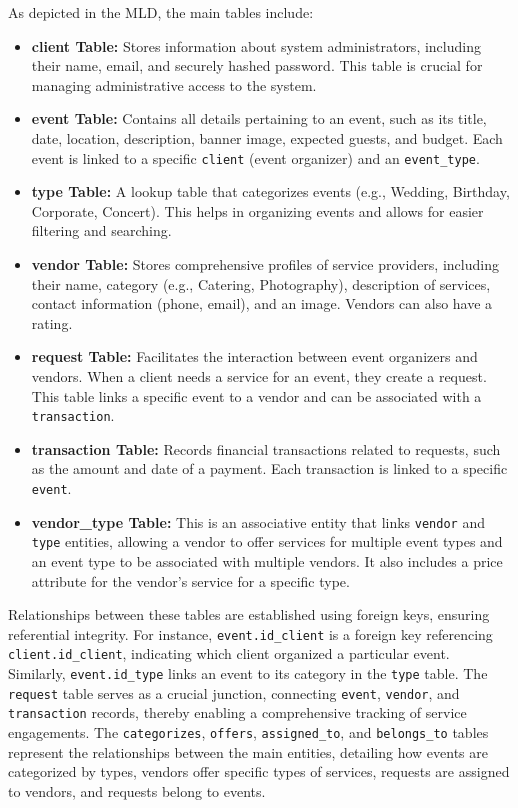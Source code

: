 \documentclass{report}
\begin{document}
As depicted in the MLD, the main tables include:
\begin{itemize}
    \item \textbf{client Table:} Stores information about system administrators, including their name, email, and securely hashed password. This table is crucial for managing administrative access to the system.
    \item \textbf{event Table:} Contains all details pertaining to an event, such as its title, date, location, description, banner image, expected guests, and budget. Each event is linked to a specific \texttt{client} (event organizer) and an \texttt{event\_type}.
    \item \textbf{type Table:} A lookup table that categorizes events (e.g., Wedding, Birthday, Corporate, Concert). This helps in organizing events and allows for easier filtering and searching.
    \item \textbf{vendor Table:} Stores comprehensive profiles of service providers, including their name, category (e.g., Catering, Photography), description of services, contact information (phone, email), and an image. Vendors can also have a rating.
    \item \textbf{request Table:} Facilitates the interaction between event organizers and vendors. When a client needs a service for an event, they create a request. This table links a specific event to a vendor and can be associated with a \texttt{transaction}.
    \item \textbf{transaction Table:} Records financial transactions related to requests, such as the amount and date of a payment. Each transaction is linked to a specific \texttt{event}.
    \item \textbf{vendor\_type Table:} This is an associative entity that links \texttt{vendor} and \texttt{type} entities, allowing a vendor to offer services for multiple event types and an event type to be associated with multiple vendors. It also includes a price attribute for the vendor's service for a specific type.
\end{itemize}
Relationships between these tables are established using foreign keys, ensuring referential integrity. For instance, \texttt{event.id\_client} is a foreign key referencing \texttt{client.id\_client}, indicating which client organized a particular event. Similarly, \texttt{event.id\_type} links an event to its category in the \texttt{type} table. The \texttt{request} table serves as a crucial junction, connecting \texttt{event}, \texttt{vendor}, and \texttt{transaction} records, thereby enabling a comprehensive tracking of service engagements. The \texttt{categorizes}, \texttt{offers}, \texttt{assigned\_to}, and \texttt{belongs\_to} tables represent the relationships between the main entities, detailing how events are categorized by types, vendors offer specific types of services, requests are assigned to vendors, and requests belong to events.
\end{document}
